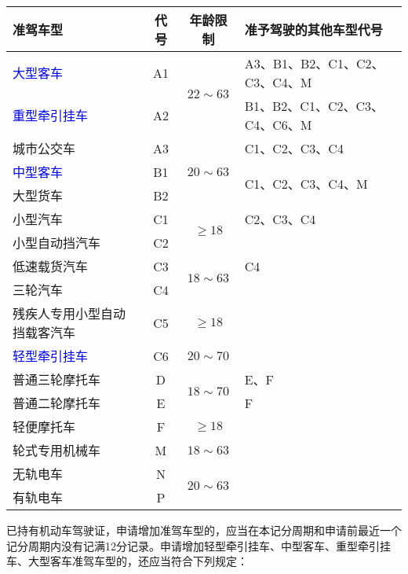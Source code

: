 \noindent

\begin{table}[htbp]
    \begin{tabular}{|l|c|c|l|}
        \hline
        \textbf{准驾车型}  & \textbf{代号}  & \textbf{年龄限制}  & \textbf{准予驾驶的其他车型代号} \\
        \hline
        \textcolor{blue}{大型客车} & A1 & \multirow{2}{*}{$22 \sim 63$} & A3、B1、B2、C1、C2、C3、C4、M \\
        \cline{1-2} \cline{4-4}
        \textcolor{blue}{重型牵引挂车} & A2 & & B1、B2、C1、C2、C3、C4、C6、M \\
        \hline
        城市公交车 & A3 & \multirow{3}{*}{$20 \sim 63$} & C1、C2、C3、C4 \\
        \cline{1-2} \cline{4-4}
        \textcolor{blue}{中型客车} & B1 & & \multirow{2}{*}{C1、C2、C3、C4、M} \\
        \cline{1-2}
        大型货车 & B2 & & \\
        \hline
        小型汽车 & C1 & \multirow{2}{*}{$\ge 18$} & C2、C3、C4 \\
        \cline{1-2} \cline{4-4}
        小型自动挡汽车 & C2 & & \\
        \hline
        低速载货汽车 & C3 & \multirow{2}{*}{$18 \sim 63$} & C4 \\
        \cline{1-2} \cline{4-4}
        三轮汽车 & C4 & & \\
        \hline
        残疾人专用小型自动挡载客汽车 & C5 & $\ge 18$ & \\
        \hline
        \textcolor{blue}{轻型牵引挂车} & C6 & $20 \sim 70$ & \\
        \hline
        普通三轮摩托车 & D & \multirow{2}{*}{$18 \sim 70$} & E、F \\
        \cline{1-2} \cline{4-4}
        普通二轮摩托车 & E & & F \\
        \hline
        轻便摩托车 & F & $\ge 18$ & \\
        \hline
        轮式专用机械车 & M & $18 \sim 63$ & \\
        \hline
        无轨电车 & N & \multirow{2}{*}{$20 \sim 63$} & \\
        \cline{1-2} \cline{4-4}
        有轨电车 & P & & \\
        \hline
    \end{tabular}
    \label{tab:Model_code}
\end{table}

已持有机动车驾驶证，申请增加准驾车型的，应当在本记分周期和申请前最近一个记分周期内没有记满12分记录。申请增加轻型牵引挂车、中型客车、重型牵引挂车、大型客车准驾车型的，还应当符合下列规定：

